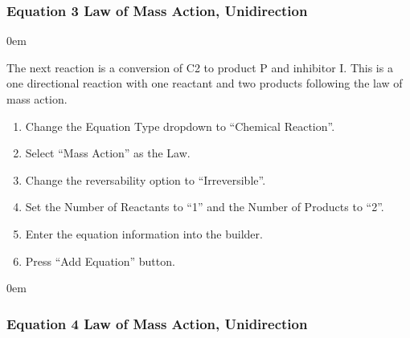 \documentclass[letterpaper,10pt,english]{sphinxmanual}
\begin{document}
\subsubsection{Equation 3 \sphinxhyphen{} Law of Mass Action, Unidirection}
\label{\detokenize{pages/tutorial_sc/createEquations:equation-3-law-of-mass-action-unidirection}}

\begin{DUlineblock}{0em}
\item[] 
\end{DUlineblock}

\sphinxAtStartPar
The next reaction is a conversion of C2 to product P and inhibitor I.
This is a one directional reaction with one reactant and two products following
the law of mass action.
\begin{enumerate}
%
\item {} 
\sphinxAtStartPar
Change the Equation Type dropdown to “Chemical Reaction”.

\item {} 
\sphinxAtStartPar
Select “Mass Action” as the Law.

\item {} 
\sphinxAtStartPar
Change the reversability option to “Irreversible”.

\item {} 
\sphinxAtStartPar
Set the Number of Reactants to “1” and the Number of Products to “2”.

\item {} 
\sphinxAtStartPar
Enter the equation information into the builder.

\item {} 
\sphinxAtStartPar
Press “Add Equation” button.

\end{enumerate}


\begin{DUlineblock}{0em}
\item[] 
\end{DUlineblock}


\subsubsection{Equation 4 \sphinxhyphen{} Law of Mass Action, Unidirection}
\label{\detokenize{pages/tutorial_sc/createEquations:equation-4-law-of-mass-action-unidirection}}
\end{document}
